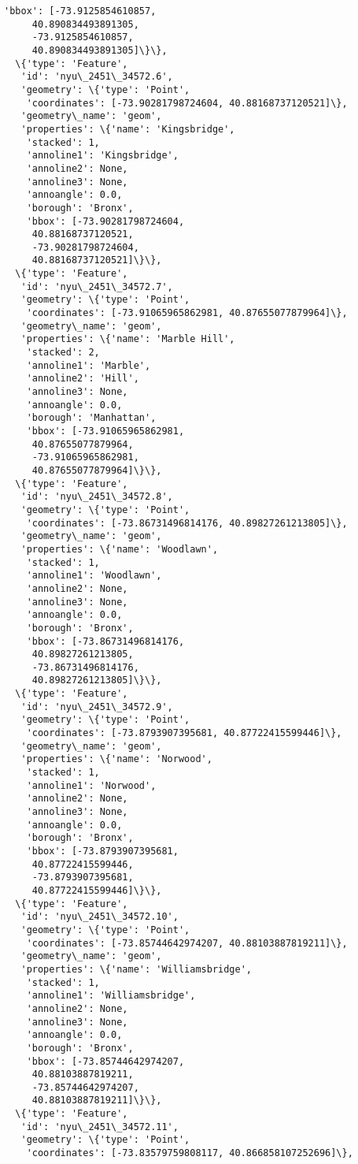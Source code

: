 \documentclass[11pt]{article}
\begin{document}
\begin{tcolorbox}[breakable, size=fbox, boxrule=.5pt, pad at break*=1mm, opacityfill=0]
\begin{Verbatim}[commandchars=\\\{\}]
    'bbox': [-73.9125854610857,
     40.890834493891305,
     -73.9125854610857,
     40.890834493891305]\}\},
  \{'type': 'Feature',
   'id': 'nyu\_2451\_34572.6',
   'geometry': \{'type': 'Point',
    'coordinates': [-73.90281798724604, 40.88168737120521]\},
   'geometry\_name': 'geom',
   'properties': \{'name': 'Kingsbridge',
    'stacked': 1,
    'annoline1': 'Kingsbridge',
    'annoline2': None,
    'annoline3': None,
    'annoangle': 0.0,
    'borough': 'Bronx',
    'bbox': [-73.90281798724604,
     40.88168737120521,
     -73.90281798724604,
     40.88168737120521]\}\},
  \{'type': 'Feature',
   'id': 'nyu\_2451\_34572.7',
   'geometry': \{'type': 'Point',
    'coordinates': [-73.91065965862981, 40.87655077879964]\},
   'geometry\_name': 'geom',
   'properties': \{'name': 'Marble Hill',
    'stacked': 2,
    'annoline1': 'Marble',
    'annoline2': 'Hill',
    'annoline3': None,
    'annoangle': 0.0,
    'borough': 'Manhattan',
    'bbox': [-73.91065965862981,
     40.87655077879964,
     -73.91065965862981,
     40.87655077879964]\}\},
  \{'type': 'Feature',
   'id': 'nyu\_2451\_34572.8',
   'geometry': \{'type': 'Point',
    'coordinates': [-73.86731496814176, 40.89827261213805]\},
   'geometry\_name': 'geom',
   'properties': \{'name': 'Woodlawn',
    'stacked': 1,
    'annoline1': 'Woodlawn',
    'annoline2': None,
    'annoline3': None,
    'annoangle': 0.0,
    'borough': 'Bronx',
    'bbox': [-73.86731496814176,
     40.89827261213805,
     -73.86731496814176,
     40.89827261213805]\}\},
  \{'type': 'Feature',
   'id': 'nyu\_2451\_34572.9',
   'geometry': \{'type': 'Point',
    'coordinates': [-73.8793907395681, 40.87722415599446]\},
   'geometry\_name': 'geom',
   'properties': \{'name': 'Norwood',
    'stacked': 1,
    'annoline1': 'Norwood',
    'annoline2': None,
    'annoline3': None,
    'annoangle': 0.0,
    'borough': 'Bronx',
    'bbox': [-73.8793907395681,
     40.87722415599446,
     -73.8793907395681,
     40.87722415599446]\}\},
  \{'type': 'Feature',
   'id': 'nyu\_2451\_34572.10',
   'geometry': \{'type': 'Point',
    'coordinates': [-73.85744642974207, 40.88103887819211]\},
   'geometry\_name': 'geom',
   'properties': \{'name': 'Williamsbridge',
    'stacked': 1,
    'annoline1': 'Williamsbridge',
    'annoline2': None,
    'annoline3': None,
    'annoangle': 0.0,
    'borough': 'Bronx',
    'bbox': [-73.85744642974207,
     40.88103887819211,
     -73.85744642974207,
     40.88103887819211]\}\},
  \{'type': 'Feature',
   'id': 'nyu\_2451\_34572.11',
   'geometry': \{'type': 'Point',
    'coordinates': [-73.83579759808117, 40.866858107252696]\},

\end{Verbatim}
\end{tcolorbox}
\end{document}
